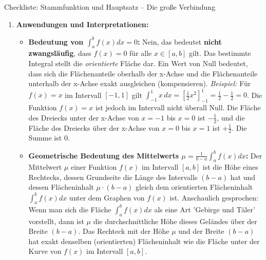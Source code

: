 \begin{loesungsumgebung}{Checkliste: Stammfunktion und Hauptsatz – Die große Verbindung}
\begin{enumerate}[label=(\alph*)]
    \item \textbf{Anwendungen und Interpretationen:}
    \begin{itemize}
        \item \textbf{Bedeutung von $\int_a^b f(x)dx = 0$:}
        Nein, das bedeutet \textbf{nicht zwangsläufig}, dass $f(x)=0$ für alle $x \in [a,b]$ gilt.
        Das bestimmte Integral stellt die \textit{orientierte} Fläche dar. Ein Wert von Null bedeutet, dass sich die Flächenanteile oberhalb der x-Achse und die Flächenanteile unterhalb der x-Achse exakt ausgleichen (kompensieren).
        \textit{Beispiel:} Für $f(x)=x$ im Intervall $[-1,1]$ gilt $\int_{-1}^1 x \,dx = [\frac{1}{2}x^2]_{-1}^1 = \frac{1}{2} - \frac{1}{2} = 0$. Die Funktion $f(x)=x$ ist jedoch im Intervall nicht überall Null. Die Fläche des Dreiecks unter der x-Achse von $x=-1$ bis $x=0$ ist $-\frac{1}{2}$, und die Fläche des Dreiecks über der x-Achse von $x=0$ bis $x=1$ ist $+\frac{1}{2}$. Die Summe ist $0$.
        \begin{center}
        \label{fig:integral_null_flaeche}
        \end{center}

        \item \textbf{Geometrische Bedeutung des Mittelwerts $\mu = \frac{1}{b-a} \int_a^b f(x)dx$:}
        Der Mittelwert $\mu$ einer Funktion $f(x)$ im Intervall $[a,b]$ ist die Höhe eines Rechtecks, dessen Grundseite die Länge des Intervalls $(b-a)$ hat und dessen Flächeninhalt $\mu \cdot (b-a)$ gleich dem orientierten Flächeninhalt $\int_a^b f(x)dx$ unter dem Graphen von $f(x)$ ist.
        Anschaulich gesprochen: Wenn man sich die Fläche $\int_a^b f(x)dx$ als eine Art 'Gebirge und Täler' vorstellt, dann ist $\mu$ die durchschnittliche Höhe dieses Geländes über der Breite $(b-a)$. Das Rechteck mit der Höhe $\mu$ und der Breite $(b-a)$ hat exakt denselben (orientierten) Flächeninhalt wie die Fläche unter der Kurve von $f(x)$ im Intervall $[a,b]$.
    \end{itemize}
\end{enumerate}

\end{loesungsumgebung}
